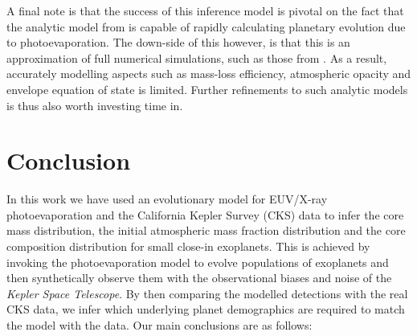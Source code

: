 \documentclass[fleqn,usenatbib]{mnras}
\begin{document}
A final note is that the success of this inference model is pivotal on the fact that the analytic model from \cite{Owen2017} is capable of rapidly calculating planetary evolution due to photoevaporation. The down-side of this however, is that this is an approximation of full numerical simulations, such as those from \cite{OwenJackson2012,Owen2013}. As a result, accurately modelling aspects such as mass-loss efficiency, atmospheric opacity and envelope equation of state is limited. Further refinements to such analytic models is thus also worth investing time in. 

\section{Conclusion}
In this work we have used an evolutionary model for EUV/X-ray photoevaporation and the California Kepler Survey (CKS) data to infer the core mass distribution, the initial atmospheric mass fraction distribution and the core composition distribution for small close-in exoplanets. This is achieved by invoking the photoevaporation model to evolve populations of exoplanets and then synthetically observe them with the observational biases and noise of the \textit{Kepler Space Telescope}. By then comparing the modelled detections with the real CKS data, we infer which underlying planet demographics are required to match the model with the data. Our main conclusions are as follows:
\end{document}
